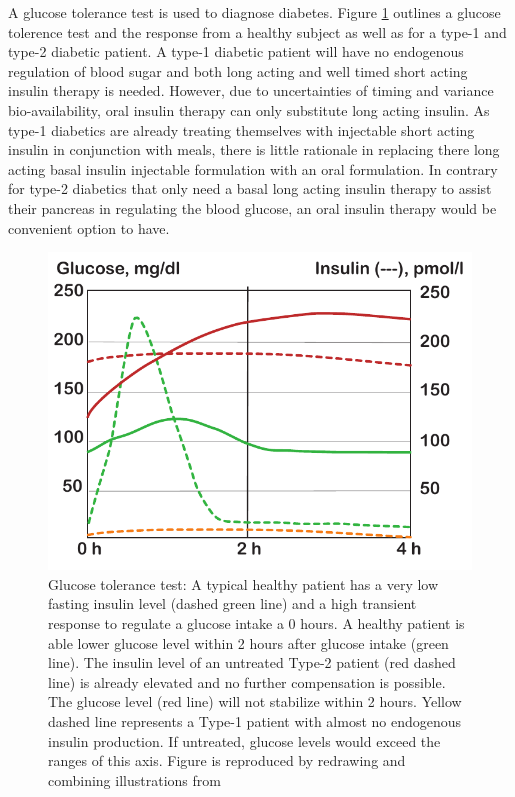 A glucose tolerance test is used to diagnose diabetes. Figure \ref{intro_glucoseTolerance} outlines a glucose tolerence test and the response from a healthy subject as well as for a type-1 and type-2 diabetic patient. A type-1 diabetic patient will have no endogenous regulation of blood sugar and both long acting and well timed short acting insulin therapy is needed. However, due to uncertainties of timing and variance bio-availability, oral insulin therapy can only substitute long acting insulin. As type-1 diabetics are already treating themselves with injectable short acting insulin in conjunction with meals, there is little rationale in replacing there long acting basal insulin injectable formulation with an oral formulation. In contrary for type-2 diabetics that only need a basal long acting insulin therapy to assist their pancreas in regulating the blood glucose, an oral insulin therapy would be convenient option to have.


\begin{figure}[ht]
\label{intro_glucoseTolerance}
\includegraphics{graphics/glucoseTolerance.pdf}
\caption{Glucose tolerance test: A typical healthy patient has a very low fasting insulin level (dashed green line) and a high transient response to regulate a glucose intake a 0 hours. A healthy patient is able lower glucose level within 2 hours after glucose intake (green line). The insulin level of an untreated Type-2 patient (red dashed line) is already elevated and no further compensation is possible. The glucose level (red line) will not stabilize within 2 hours. Yellow dashed line represents a Type-1 patient with almost no endogenous insulin production. If untreated, glucose levels would exceed the ranges of this axis. Figure is reproduced by redrawing and combining illustrations from \cite{silverthorn2010human,caumo2004first}}
\end{figure}

